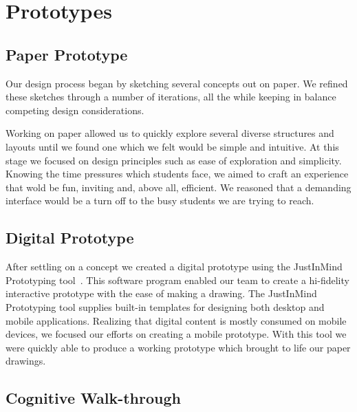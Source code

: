 \documentclass{sigchi-ext}
\begin{document}


\section{Prototypes}

\subsection{Paper Prototype}

Our design process began by sketching several concepts out on paper. We refined
these sketches through a number of iterations, all the while keeping in balance
competing design considerations.

Working on paper allowed us to quickly explore several diverse structures and
layouts until we found one which we felt would be simple and intuitive. At this
stage we focused on design principles such as ease of exploration and simplicity.
Knowing the time pressures which students face, we aimed to craft an experience
that wold be fun, inviting and, above all, efficient. We reasoned that a
demanding interface would be a turn off to the busy students we are trying to
reach.


\subsection{Digital Prototype}

After settling on a concept we created a digital prototype using the JustInMind Prototyping
tool~\cite{justinmind}. This software program enabled our team to create a hi-fidelity interactive
prototype with the ease of making a drawing. The JustInMind Prototyping tool supplies built-in
templates for designing both desktop and mobile applications. Realizing that digital content is
mostly consumed on mobile devices, we focused our efforts on creating a mobile prototype. With this
tool we were quickly able to produce a working prototype which brought to life our paper drawings.


\subsection{Cognitive Walk-through}
\end{document}
